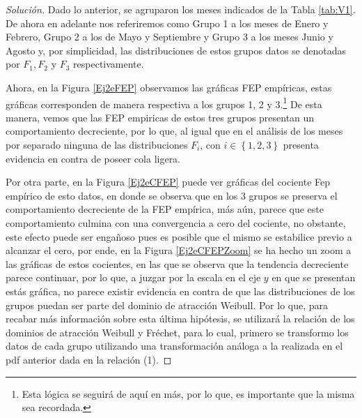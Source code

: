 \documentclass[10.5pt,notitlepage]{article}
\newenvironment{solucion}
  {\begin{proof}[Solución]}
  {\end{proof}}
\newcommand{\kis}[1]{\left\{ #1 \right\}}
\theoremstyle{plain}
\begin{document}
\begin{solucion}
Dado lo anterior, se agruparon los meses indicados de la Tabla \ref{tab:V1}. De ahora en adelante nos referiremos como Grupo 1 a los meses de Enero y Febrero, Grupo 2 a los de Mayo y Septiembre y Grupo 3 a los meses Junio y Agosto y, por simplicidad, las distribuciones de estos grupos datos se denotadas por \(F_1, F_2\) y \(F_3\) respectivamente. 

Ahora, en la Figura \ref{Ej2eFEP} observamos las gráficas FEP empíricas, estas gráficas corresponden de manera respectiva a los grupos 1, 2 y 3.\footnote{Esta lógica se seguirá de aquí en más, por lo que, es importante que la misma sea recordada.} De esta manera, vemos que las FEP empiricas de estos tres grupos presentan un comportamiento decreciente, por lo que, al igual que en el análisis de los meses por separado ninguna de las distribuciones \(F_i\), con \(i \in \kis{1,2,3}\) presenta evidencia en contra de poseer cola ligera. 

Por otra parte, en la Figura \ref{Ej2eCFEP} puede ver gráficas del cociente Fep empírico de esto datos, en donde se observa que en los 3 grupos se preserva el comportamiento decreciente de la FEP empírica, más aún, parece que este comportamiento culmina con una convergencia a cero del cociente, no obstante, este efecto puede ser engañoso pues es posible que el mismo se estabilice previo a alcanzar el cero, por ende, en la Figura \ref{Ej2eCFEPZoom} se ha hecho un zoom a las gráficas de estos cocientes, en las que se observa que la tendencia decreciente parece continuar, por lo que, a juzgar por la escala en el eje \(y\) en que se presentan estás gráfica, no parece existir evidencia en contra de que las  distribuciones de los grupos puedan ser parte del dominio de atracción Weibull. Por lo que, para recabar más información sobre esta última hipótesis, se utilizará la relación de los dominios de atracción Weibull y Fréchet, para lo cual, primero se transformo los datos de cada grupo utilizando una transformación análoga a la realizada en el pdf anterior dada en la relación (1).


\end{solucion}
\end{document}
